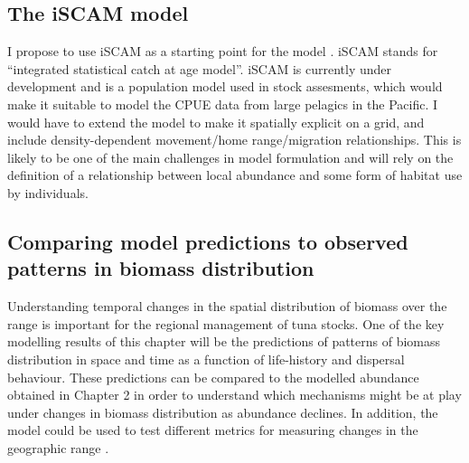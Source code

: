 \documentclass{article}
\begin{document}


\subsection{The iSCAM model}

I propose to use iSCAM as a starting point for the model
\citep{Martell2012_a}. iSCAM stands for ``integrated statistical catch at age
model''. iSCAM is currently under development and is a population
model used in stock assesments, which would make it suitable to model the
CPUE data from large pelagics in the Pacific. I would have to extend
the model to make it spatially explicit on a grid, and include
density-dependent movement/home range/migration relationships. This is
likely to be one of the main challenges in model formulation and will
rely on the definition of a relationship between local abundance and
some form of habitat use by individuals.

\subsection{Comparing model predictions to observed patterns in
  biomass distribution}

Understanding temporal changes in the spatial distribution of biomass
over the range is important for the regional management of
tuna stocks. One of the key modelling results of this chapter will be
the predictions of patterns of biomass distribution in space
and time as a function of life-history and dispersal behaviour. These
predictions can be compared to the modelled abundance obtained in
Chapter 2 in order to understand which mechanisms might be at
play under changes in biomass distribution as abundance declines. In
addition, the model could be used to test different metrics for
measuring changes in the geographic range \citep[for example CPUE
thresholds as done in Chapter 2, and other methods advocated
in][]{Swain1994_a}.
\end{document}
